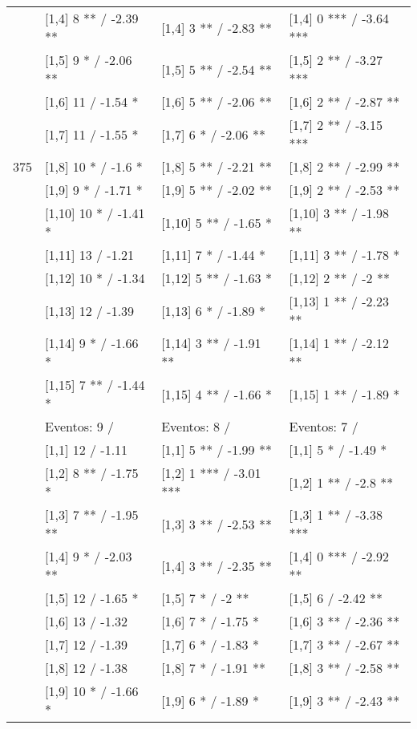 \begin{table}
\begin{tabular}[t]{llll}
\addlinespace
 & {}[1,4] 8 ** / -2.39 ** & {}[1,4] 3 ** / -2.83 ** & {}[1,4] 0 *** / -3.64 ***\\
 & {}[1,5] 9 * / -2.06 ** & {}[1,5] 5 ** / -2.54 ** & {}[1,5] 2 ** / -3.27 ***\\
 & {}[1,6] 11  / -1.54 * & {}[1,6] 5 ** / -2.06 ** & {}[1,6] 2 ** / -2.87 **\\
 & {}[1,7] 11  / -1.55 * & {}[1,7] 6 * / -2.06 ** & {}[1,7] 2 ** / -3.15 ***\\
375 & {}[1,8] 10 * / -1.6 * & {}[1,8] 5 ** / -2.21 ** & {}[1,8] 2 ** / -2.99 **\\
\addlinespace
 & {}[1,9] 9 * / -1.71 * & {}[1,9] 5 ** / -2.02 ** & {}[1,9] 2 ** / -2.53 **\\
 & {}[1,10] 10 * / -1.41 * & {}[1,10] 5 ** / -1.65 * & {}[1,10] 3 ** / -1.98 **\\
 & {}[1,11] 13  / -1.21 & {}[1,11] 7 * / -1.44 * & {}[1,11] 3 ** / -1.78 *\\
 & {}[1,12] 10 * / -1.34 & {}[1,12] 5 ** / -1.63 * & {}[1,12] 2 ** / -2 **\\
 & {}[1,13] 12  / -1.39 & {}[1,13] 6 * / -1.89 * & {}[1,13] 1 ** / -2.23 **\\
\addlinespace
 & {}[1,14] 9 * / -1.66 * & {}[1,14] 3 ** / -1.91 ** & {}[1,14] 1 ** / -2.12 **\\
 & {}[1,15] 7 ** / -1.44 * & {}[1,15] 4 ** / -1.66 * & {}[1,15] 1 ** / -1.89 *\\
 & Eventos:  9 / & Eventos:  8 / & Eventos:  7 /\\
 & {}[1,1] 12  / -1.11 & {}[1,1] 5 ** / -1.99 ** & {}[1,1] 5 * / -1.49 *\\
 & {}[1,2] 8 ** / -1.75 * & {}[1,2] 1 *** / -3.01 *** & {}[1,2] 1 ** / -2.8 **\\
\addlinespace
 & {}[1,3] 7 ** / -1.95 ** & {}[1,3] 3 ** / -2.53 ** & {}[1,3] 1 ** / -3.38 ***\\
 & {}[1,4] 9 * / -2.03 ** & {}[1,4] 3 ** / -2.35 ** & {}[1,4] 0 *** / -2.92 **\\
 & {}[1,5] 12  / -1.65 * & {}[1,5] 7 * / -2 ** & {}[1,5] 6  / -2.42 **\\
 & {}[1,6] 13  / -1.32 & {}[1,6] 7 * / -1.75 * & {}[1,6] 3 ** / -2.36 **\\
 & {}[1,7] 12  / -1.39 & {}[1,7] 6 * / -1.83 * & {}[1,7] 3 ** / -2.67 **\\
\addlinespace
500 & {}[1,8] 12  / -1.38 & {}[1,8] 7 * / -1.91 ** & {}[1,8] 3 ** / -2.58 **\\
 & {}[1,9] 10 * / -1.66 * & {}[1,9] 6 * / -1.89 * & {}[1,9] 3 ** / -2.43 **\\

\end{tabular}
\end{table}
